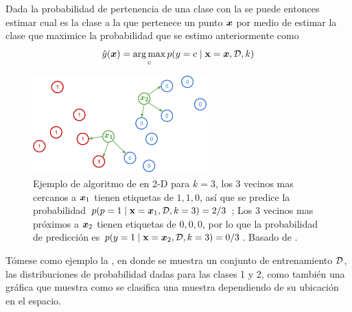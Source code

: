 Dada la probabilidad de pertenencia de una clase con la  se puede entonces estimar cual es la clase a la que pertenece un punto ${\bm{x}}$ por medio de estimar la clase que maximice la probabilidad que se estimo anteriormente como
\begin{equation}
  \hat{y}({\bm{x}}) = \operatorname*{arg\,max}_{c} p(y = c \mid {\mathbf{x}} = {\bm{x}}, \mathcal{D}, k)
\end{equation}

\begin{figure}[H]
  \centering
  \includegraphics[width=0.60\textwidth]{Figures/knn-example.pdf}
  \decoRule
  \caption[Ejemplo de algoritmo de \textsl{}]{Ejemplo de algoritmo de \textsl{} en 2-D para $k = 3$, los 3 vecinos mas cercanos a ${\bm{x}}_1$ tienen etiquetas de $1, 1, 0$, así que se predice la probabilidad $p(p = 1 \mid {\mathbf{x}} = {\bm{x}}_1, \mathcal{D}, k=3) = 2/3$ ; Los 3 vecinos mas próximos a ${\bm{x}}_2$ tienen etiquetas de $0, 0, 0$, por lo que la probabilidad de predicción es $p(y=1 \mid {\mathbf{x}} = {\bm{x}}_2, \mathcal{D}, k=3) = 0/3$. Basado de \cite{murphymachinel}.}
  \label{fig:knn-example}
\end{figure}

Tómese como ejemplo la , en donde se muestra un conjunto de entrenamiento $\mathcal{D}$, las distribuciones de probabilidad dadas para las clases 1 y 2, como también una gráfica que muestra como se clasifica una muestra dependiendo de su ubicación en el espacio.

